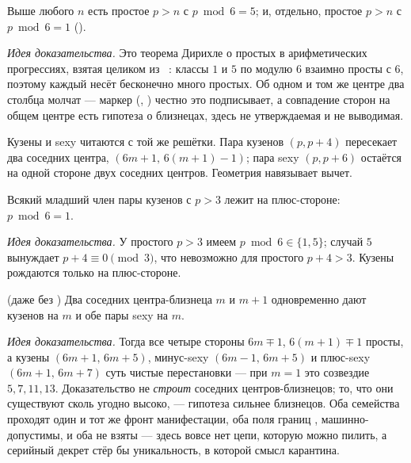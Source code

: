 \begin{theorem}\label{thm:minusSide_primes_unbounded}
\green{}\; Выше любого $n$ есть простое $p>n$ с $p\bmod 6 = 5$; и, отдельно, простое $p>n$ с
$p\bmod 6 = 1$ ().
\end{theorem}

\emph{Идея доказательства.} Это теорема Дирихле о простых в арифметических прогрессиях, взятая
целиком из ~\cite{mathlib}: классы $1$ и $5$ по модулю $6$ взаимно просты с $6$,
поэтому каждый несёт бесконечно много простых. Об одном и том же центре два столбца молчат ---
маркер  (\green{}, ) честно это подписывает, а
совпадение сторон на общем центре есть гипотеза о близнецах, здесь не утверждаемая и не выводимая.

Кузены и sexy читаются с той же решётки. Пара кузенов $(p,p+4)$ пересекает два соседних центра,
$(6m+1,\,6(m+1)-1)$; пара sexy $(p,p+6)$ остаётся на одной стороне двух соседних центров. Геометрия
навязывает вычет.

\begin{theorem}\label{thm:cousin_mod_six}
\green{}\; Всякий младший член пары кузенов с $p>3$ лежит на плюс-стороне: $p\bmod 6 = 1$.
\end{theorem}

\emph{Идея доказательства.} У простого $p>3$ имеем $p\bmod 6\in\{1,5\}$; случай $5$ вынуждает
$p+4\equiv 0\pmod 3$, что невозможно для простого $p+4>3$. Кузены рождаются только на плюс-стороне.

\begin{theorem}\label{thm:constellation_of_adjacent_twinCenters}
\green{} (даже без )\; Два соседних центра-близнеца $m$ и $m+1$ одновременно
дают кузенов на $m$ и обе пары sexy на $m$.
\end{theorem}

\emph{Идея доказательства.} Тогда все четыре стороны $6m\mp1$, $6(m+1)\mp1$ просты, а кузены
$(6m+1,\,6m+5)$, минус-sexy $(6m-1,\,6m+5)$ и плюс-sexy $(6m+1,\,6m+7)$ суть чистые перестановки ---
при $m=1$ это созвездие $5,7,11,13$. Доказательство не \emph{строит} соседних центров-близнецов; то,
что они существуют сколь угодно высоко, --- гипотеза сильнее близнецов. Оба семейства проходят один
и тот же фронт манифестации, оба поля границ , 
машинно-допустимы, и оба не взяты --- здесь вовсе нет цепи, которую можно пилить, а серийный декрет
стёр бы уникальность, в которой смысл карантина.

